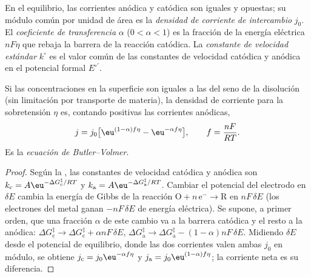 \begin{definition}\label{def:b3:electrode-kinetics:exchange}
En el equilibrio, las corrientes anódica y catódica son iguales y opuestas; su
módulo común por unidad de área es la \emph{densidad de corriente de
intercambio} $j_0$. El \emph{coeficiente de transferencia}
 $\alpha$ ($0 < \alpha < 1$) es la fracción de la
energía eléctrica $nF\eta$ que rebaja la barrera de la reacción catódica. La
\emph{constante de velocidad estándar} $k^\circ$ es el valor común
de las constantes de velocidad catódica y anódica en el potencial formal $E^{\circ\prime}$.
\end{definition}

\begin{theorem}\label{thm:b3:electrode-kinetics:butler-volmer}
Si las concentraciones en la superficie son iguales a las del seno de la disolución (sin limitación
por transporte de materia), la densidad de corriente para la sobretensión $\eta$ es, contando
positivas las corrientes anódicas,
\[
  j = j_0\bigl[\eu^{(1 - \alpha)f\eta} - \eu^{-\alpha f\eta}\bigr], \qquad f = \frac{nF}{RT}.
\]
Es la \emph{ecuación de Butler--Volmer}.
\end{theorem}

\begin{proof}
Según la , las constantes de velocidad catódica y anódica son
$k_{\mathrm c} = A\eu^{-\Delta G_{\mathrm c}^{\ddagger}/RT}$ y $k_{\mathrm a} = A\eu^{-\Delta G_{\mathrm a}^{\ddagger}/RT}$. Cambiar el potencial del electrodo en $\delta E$
cambia la energía de Gibbs de la reacción $\mathrm{O} + n\,\mathrm{e}^- \to \mathrm{R}$ en $nF\,\delta E$ (los electrones
del metal ganan $-nF\,\delta E$ de energía eléctrica). Se supone, a primer orden, que una
fracción $\alpha$ de este cambio va a la barrera catódica y el resto a la
anódica: $\Delta G_{\mathrm c}^{\ddagger} \to \Delta G_{\mathrm c}^{\ddagger} + \alpha nF\,\delta E$, $\Delta G_{\mathrm a}^{\ddagger} \to \Delta G_{\mathrm a}^{\ddagger} - (1 - \alpha)nF\,\delta E$. Midiendo $\delta E$
desde el potencial de equilibrio, donde las dos corrientes valen ambas $j_0$ en
módulo, se obtiene $j_{\mathrm c} = j_0\eu^{-\alpha f\eta}$ y $j_{\mathrm a} = j_0\eu^{(1 - \alpha)f\eta}$; la corriente neta es su
diferencia.
\end{proof}

